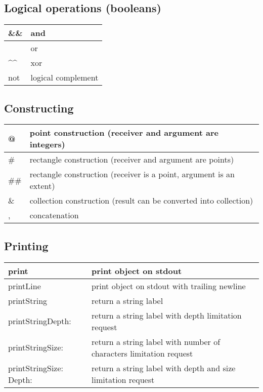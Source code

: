 \documentclass[letterpaper,10pt,english]{sphinxmanual}
\begin{document}
\subsection{Logical operations (booleans)}
\label{\detokenize{usefulselectors:logical-operations-booleans}}
\noindent\begin{tabulary}{\linewidth}{p{5cm} p{10cm}}
\hline

\&\&
&
and
\\
\hline
\textbar{}\textbar{}
&
or
\\
\hline
\textasciicircum{}\textasciicircum{}
&
xor
\\
\hline
not
&
logical complement
\\
\hline\end{tabulary}



\subsection{Constructing}
\label{\detokenize{usefulselectors:constructing}}
\noindent\begin{tabulary}{\linewidth}{p{5cm} p{10cm}}
\hline

@
&
point construction (receiver and argument are integers)
\\
\hline
\#
&
rectangle construction (receiver and argument are points)
\\
\hline
\#\#
&
rectangle construction (receiver is a point, argument is an extent)
\\
\hline
\&
&
collection construction (result can be converted into collection)
\\
\hline
,
&
concatenation
\\
\hline\end{tabulary}



\subsection{Printing}
\label{\detokenize{usefulselectors:printing}}
\noindent\begin{tabulary}{\linewidth}{p{5cm} p{10cm}}
\hline

print
&
print object on stdout
\\
\hline
printLine
&
print object on stdout with trailing newline
\\
\hline
printString
&
return a string label
\\
\hline
printStringDepth:
&
return a string label with depth limitation request
\\
\hline
printStringSize:
&
return a string label with number of characters limitation request
\\
\hline
printStringSize: Depth:
&
return a string label with depth and size limitation request
\\
\hline\end{tabulary}
\end{document}
